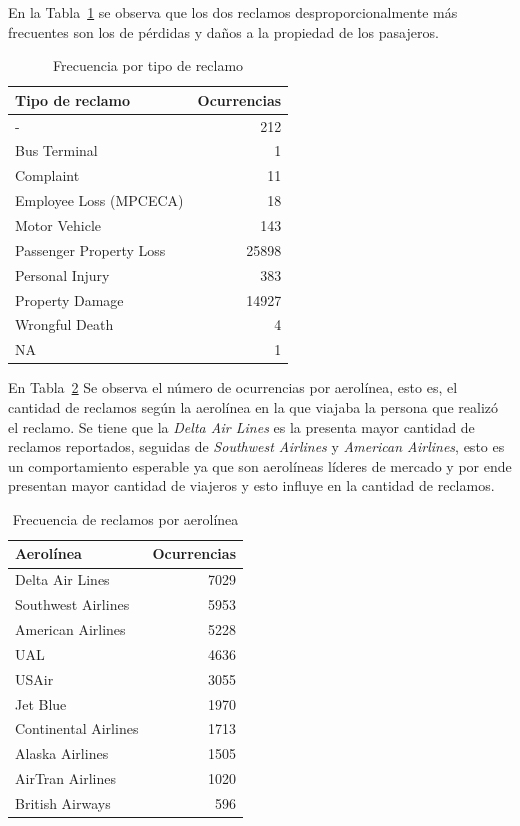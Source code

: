 \documentclass[
  letterpaper,
  onepage,
  openany]{scrreprt}
\begin{document}
En la Tabla~\ref{tbl-tiporeclamo} se observa que los dos reclamos
desproporcionalmente más frecuentes son los de pérdidas y daños a la
propiedad de los pasajeros.

\hypertarget{tbl-tiporeclamo}{}
\begin{table}
\caption{\label{tbl-tiporeclamo}Frecuencia por tipo de reclamo }\tabularnewline

\centering
\begin{tabular}{l|r}
\hline
Tipo de reclamo & Ocurrencias\\
\hline
- & 212\\
\hline
Bus Terminal & 1\\
\hline
Complaint & 11\\
\hline
Employee Loss (MPCECA) & 18\\
\hline
Motor Vehicle & 143\\
\hline
Passenger Property Loss & 25898\\
\hline
Personal Injury & 383\\
\hline
Property Damage & 14927\\
\hline
Wrongful Death & 4\\
\hline
NA & 1\\
\hline
\end{tabular}
\end{table}

En Tabla~\ref{tbl-aerolinea} Se observa el número de ocurrencias por
aerolínea, esto es, el cantidad de reclamos según la aerolínea en la que
viajaba la persona que realizó el reclamo. Se tiene que la \emph{Delta
Air Lines} es la presenta mayor cantidad de reclamos reportados,
seguidas de \emph{Southwest Airlines} y \emph{American Airlines}, esto
es un comportamiento esperable ya que son aerolíneas líderes de mercado
y por ende presentan mayor cantidad de viajeros y esto influye en la
cantidad de reclamos.

\hypertarget{tbl-aerolinea}{}
\begin{table}
\caption{\label{tbl-aerolinea}Frecuencia de reclamos por aerolínea }\tabularnewline

\centering
\begin{tabular}{l|r}
\hline
Aerolínea  & Ocurrencias\\
\hline
Delta Air Lines & 7029\\
\hline
Southwest Airlines & 5953\\
\hline
American Airlines & 5228\\
\hline
UAL & 4636\\
\hline
USAir & 3055\\
\hline
Jet Blue & 1970\\
\hline
Continental Airlines & 1713\\
\hline
Alaska Airlines & 1505\\
\hline
AirTran Airlines & 1020\\
\hline
British Airways & 596\\
\hline
\end{tabular}
\end{table}
\end{document}

